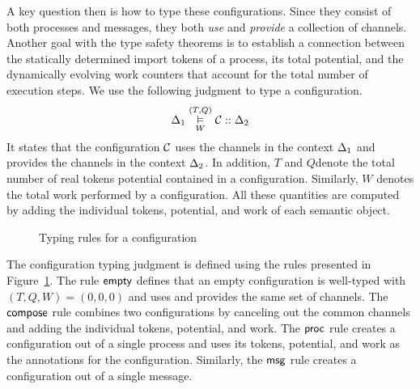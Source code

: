 A key question then is how to type these configurations.
Since they consist of both processes and messages, they
both \emph{use} and \emph{provide} a collection of channels.
Another goal with the type safety theorems is to establish a connection
between the statically determined import tokens of a process,
its total potential, and the dynamically evolving work counters
that account for the total number of execution steps.
We use the following judgment to type a configuration.
\[
\Delta_1 \overset{(T, Q)}{\underset{W}{\vDash}} \mathcal{C} :: \Delta_2
\]
It states that the configuration $\mathcal{C}$
uses the channels in the context $\Delta_1$ and provides the channels in
the context $\Delta_2$.
In addition, $T$ and $Q$denote the total number of real tokens
potential contained in a configuration.
Similarly, $W$ denotes the total work performed by a configuration.
All these quantities are computed by adding the individual tokens,
potential, and work of each semantic object.
\begin{figure}[t]
\caption{Typing rules for a configuration}
\label{fig:config_typing}
\end{figure}

The configuration typing judgment is defined using
the rules presented in Figure~\ref{fig:config_typing}.
%
The rule $\mathsf{empty}$ defines that an empty configuration
is well-typed with $(T, Q, W) = (0, 0, 0)$ and uses and
provides the same set of channels.
The $\mathsf{compose}$ rule combines two configurations by canceling out
the common channels and adding the individual tokens, potential, and work.
The $\mathsf{proc}$ rule creates a configuration out of a single process
and uses its tokens, potential, and work as the annotations for the
configuration.
Similarly, the $\mathsf{msg}$ rule creates a configuration out of a single message.

